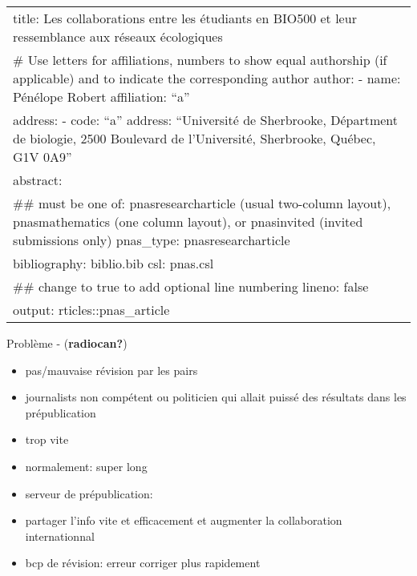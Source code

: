 \documentclass[9pt,twocolumn,twoside,]{pnas-new}
\title{}
\providecommand{\tightlist}{%
  \setlength{\itemsep}{0pt}\setlength{\parskip}{0pt}}
\begin{document}
\verticaladjustment{-2pt}



\maketitle
\thispagestyle{firststyle}


\acknow{}

\begin{longtable}[]{@{}
  >{\raggedright\arraybackslash}p{}@{}}
\toprule
\endhead
title: Les collaborations entre les étudiants en BIO500 et leur
ressemblance aux réseaux écologiques \\
\# Use letters for affiliations, numbers to show equal authorship (if
applicable) and to indicate the corresponding author author: - name:
Pénélope Robert affiliation: ``a'' \\
address: - code: ``a'' address: ``Université de Sherbrooke, Départment
de biologie, 2500 Boulevard de l'Université, Sherbrooke, Québec, G1V
0A9'' \\
abstract: \textbar{} \\
\#\# must be one of: pnasresearcharticle (usual two-column layout),
pnasmathematics (one column layout), or pnasinvited (invited submissions
only) pnas\_type: pnasresearcharticle \\
bibliography: biblio.bib csl: pnas.csl \\
\#\# change to true to add optional line numbering lineno: false \\
output: rticles::pnas\_article \\
\bottomrule
\end{longtable}

Problème - (\textbf{radiocan?})

\begin{itemize}
\tightlist
\item
  pas/mauvaise révision par les pairs
\item
  journalists non compétent ou politicien qui allait puissé des
  résultats dans les prépublication
\item
  trop vite
\item
  normalement: super long
\item
  serveur de prépublication:
\item
  partager l'info vite et efficacement et augmenter la collaboration
  internationnal
\item
  bcp de révision: erreur corriger plus rapidement
\end{itemize}
\end{document}
